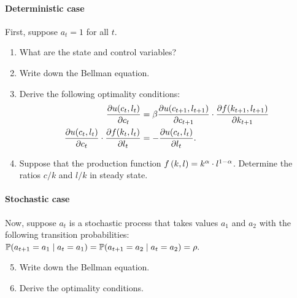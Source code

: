 \documentclass[letterpaper, 11pt, leqno]{article}
\begin{document}
\paragraph{Deterministic case} First, suppose $a_{t}=1$ for all $t$.

\begin{enumerate}
\item What are the state and control variables?
\item  Write down the Bellman equation.
\item Derive the following optimality conditions: 
\begin{align*}
\pd{u(c_{t},l_{t})}{c_{t}} &=\b  \pd{u(c_{t+1},l_{t+1})}{c_{t+1}} \cdot \pd{f(k_{t+1},l_{t+1})}{k_{t+1}}\\
\pd{u(c_{t},l_{t})}{c_{t}} \cdot \pd{f(k_{t},l_{t})}{l_{t}} &=-\pd{u(c_{t},l_{t})}{l_{t}}.
\end{align*}
\item Suppose that the production function $f\left( k,l \right) =k^{\alpha}\cdot l^{1-\alpha}$. Determine the ratios $c/k$ and $l/k$ in steady state.
\end{enumerate}

\paragraph{Stochastic case} Now, suppose $a_{t}$ is a stochastic process that takes values $a_{1}$ and $a_{2}$ with the following transition probabilities: $\P{a_{t+1}=a_{1}\mid a_{t}=a_{1}} =\P{a_{t+1}=a_{2}\mid a_{t}=a_{2}} =\r.$
\begin{enumerate}\setcounter{enumi}{4}
\item Write down the Bellman equation.
\item Derive the optimality conditions.
\end{enumerate}
\end{document}
